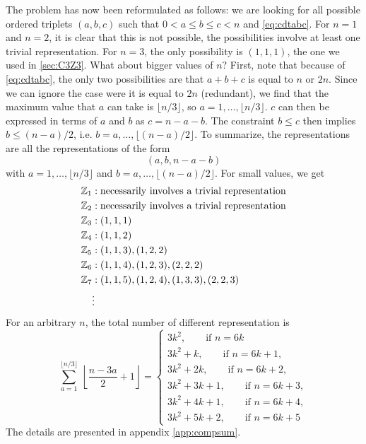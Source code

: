 \documentclass[a4paper,10pt]{article}
\begin{document}
            The problem has now been reformulated as follows:
            we are looking for all possible ordered triplets $(a,b,c)$ such that $0<a\leq b\leq c<n$ and \eqref{eq:cdtabc}. For $n=1$ and $n=2$, it is clear that this is not possible, the possibilities involve at least one trivial representation. For $n=3$, the only possibility is $(1,1,1)$, the one we used in \ref{sec:C3Z3}. What about bigger values of $n$? First, note that because of \eqref{eq:cdtabc}, the only two possibilities are that $a+b+c$ is equal to $n$ or $2n$. Since we can ignore the case were it is equal to $2n$ (redundant\marker), we find that the maximum value that $a$ can take is $\lfloor n/3\rfloor$, so $a=1,\dots,\lfloor n/3\rfloor$. $c$ can then be expressed in terms of $a$ and $b$ as $c=n-a-b$. The constraint $b\leq c$ then implies $b\leq (n-a)/2$, i.e. $b=a,\dots,\lfloor (n-a)/2\rfloor$. To summarize, the representations are all the representations of the form
            \begin{equation}
                (a,b,n-a-b)
            \end{equation}
            with $a=1,\dots,\lfloor n/3\rfloor$ and $b=a,\dots,\lfloor (n-a)/2\rfloor$. For small values, we get
            \begin{align*}
                \mathbb{Z}_1 &: \text{necessarily involves a trivial representation}\\
                \mathbb{Z}_2 &: \text{necessarily involves a trivial representation}\\
                \mathbb{Z}_3 &: (1,1,1)\\
                \mathbb{Z}_4 &: (1,1,2)\\
                \mathbb{Z}_5 &: (1,1,3),(1,2,2)\label{reprZ5C3}\\
                \mathbb{Z}_6 &: (1,1,4),(1,2,3),(2,2,2)\\
                \mathbb{Z}_7 &: (1,1,5),(1,2,4),(1,3,3),(2,2,3)\\
                &\vdots
            \end{align*}
            For an arbitrary $n$, the total number of different representation is
            \begin{equation}
                \sum^{\lfloor n/3\rfloor}_{a=1}~\left\lfloor \frac{n-3a}{2}+1\right\rfloor = \begin{cases}
                    3k^2,\qquad\text{if $n=6k$}\\
                    3k^2+k,\qquad\text{if $n=6k+1$},\\
                    3k^2+2k,\qquad\text{if $n=6k+2$},\\
                    3k^2+3k+1,\qquad\text{if $n=6k+3$},\\
                    3k^2+4k+1,\qquad\text{if $n=6k+4$},\\
                    3k^2+5k+2,\qquad\text{if $n=6k+5$}
                \end{cases}
            \end{equation}
            The details are presented in appendix \ref{app:compsum}.
\end{document}
